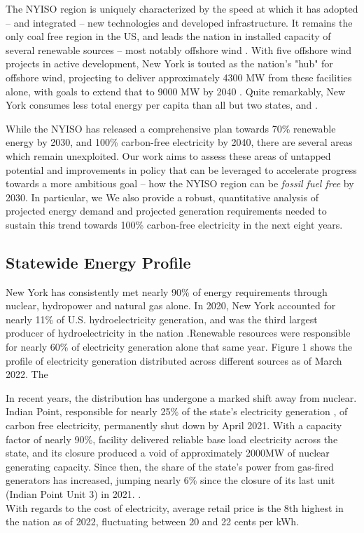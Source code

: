 \documentclass[plain]{article}
\newcommand{\1}{\mathbbm{1}}
\begin{document}
The NYISO region is uniquely characterized by the speed at which it has adopted -- and integrated -- new technologies and developed infrastructure. It remains the only coal free region in the US, and leads the nation in installed capacity of several renewable sources -- most notably offshore wind \cite{noauthor_new_nodate-1} . With five offshore wind projects in active development, New York is touted as the nation's "hub" for offshore wind, projecting to deliver approximately 4300 MW from these facilities alone, with goals to extend that to 9000 MW by 2040 . Quite remarkably, New York consumes less total energy per capita than all but two states, and .

While the NYISO has released a comprehensive plan towards 70\% renewable energy by 2030, and 100\% carbon-free electricity by 2040, 
there are several areas which remain unexploited. Our work aims to assess these areas of untapped potential and improvements in policy that can be leveraged to accelerate progress towards a more ambitious goal -- how the NYISO region can be \textit{fossil fuel free} by 2030. In particular, we  We also provide a robust, quantitative analysis of projected energy demand and projected generation requirements needed to sustain this trend towards 100\% carbon-free electricity in the next eight years.

\subsection{Statewide Energy Profile}
New York has consistently met nearly 90\% of energy requirements through nuclear, hydropower and natural gas alone. In 2020, New York accounted for nearly 11\% of U.S. hydroelectricity generation, and was the third largest producer of hydroelectricity in the nation .Renewable resources were responsible for nearly 60\% of electricity generation alone that same year. Figure 1 shows the profile of electricity generation distributed across different sources as of March 2022. The 

\missingfigure{}
In recent years, the distribution has undergone a marked shift away from nuclear. Indian Point, responsible for nearly 25\% of the state's electricity generation \cite{mcgeehan_indian_2021}, of carbon free electricity, permanently shut down by April 2021. With a capacity factor of nearly 90\%, facility delivered reliable base load electricity across the state, and its closure produced a void of approximately 2000MW of nuclear generating capacity. Since then, the share of the state's power from gas-fired generators has increased, jumping nearly 6\% since the closure of its last unit (Indian Point Unit 3) in 2021. .
\\
With regards to the cost of electricity, average retail price is the 8th highest in the nation as of 2022, fluctuating between 20 and 22 cents per kWh.
\end{document}
